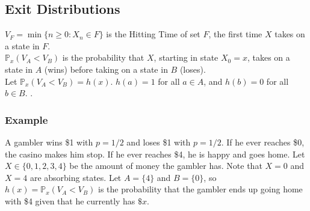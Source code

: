 \documentclass{article}
\begin{document}
\subsection{Exit Distributions}
$V_F = \min\{n \ge 0: X_n \in F\}$ is the Hitting Time of set $F$, the first time $X$ takes on a state in $F$. \\

$\mathbb{P}_x(V_A < V_B)$ is the probability that $X$, starting in state $X_0 = x$, takes on a state in $A$ (wins) before taking on a state in $B$ (loses). \\

Let $\mathbb{P}_x(V_A < V_B) = h(x)$. $h(a) = 1$ for all $a \in A$, and $h(b) = 0$ for all $b \in B$. . \\

\subsubsection{Example}\label{subsec:fair_gambler}
A gambler wins \$1 with $p=1/2$ and loses \$1 with $p=1/2$. If he ever reaches \$0, the casino makes him stop. If he ever reaches \$4, he is happy and goes home. Let $X \in \{0, 1, 2, 3, 4\}$ be the amount of money the gambler has. Note that $X = 0$ and $X = 4$ are absorbing states. Let $A = \{4\}$ and $B = \{0\}$, so $h(x) = \mathbb{P}_x(V_A < V_B)$ is the probability that the gambler ends up going home with \$4 given that he currently has $\$x$.
\end{document}
